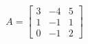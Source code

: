 \documentclass[preview]{standalone}
\begin{document}
\begin{align*}
A = \begin{bmatrix} 3 & -4 & 5 \\ 1 & -1 & 1 \\ 0 & -1 & 2 \end{bmatrix}
\end{align*}
\end{document}
